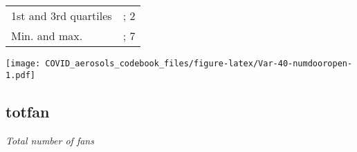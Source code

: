 \documentclass[]{article}
\begin{document}
\begin{minipage}{0.75 \textwidth}
\begin{longtable}[]{@{}lr@{}}
\begin{minipage}[t]{0.34\columnwidth}\raggedright
1st and 3rd quartiles\strut
\end{minipage} & \begin{minipage}[t]{0.13\columnwidth}\raggedleft
1; 2\strut
\end{minipage}\tabularnewline
\begin{minipage}[t]{0.34\columnwidth}\raggedright
Min. and max.\strut
\end{minipage} & \begin{minipage}[t]{0.13\columnwidth}\raggedleft
0; 7\strut
\end{minipage}\tabularnewline
\bottomrule
\end{longtable}

\end{minipage}
\begin{minipage}{0.25 \textwidth}

\texttt{[image: COVID\_aerosols\_codebook\_files/figure-latex/Var-40-numdooropen-1.pdf]}

\end{minipage}

\noindent\makebox[\linewidth]{\rule{\textwidth}{0.4pt}}

\hypertarget{totfan}{%
\subsection{totfan}\label{totfan}}

\emph{Total number of fans}
\end{document}

